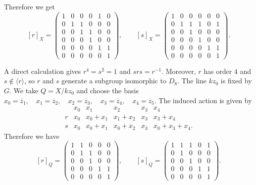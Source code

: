 \documentclass[11pt]{article}
\theoremstyle{definition}
\begin{document}
	
	Therefore we get 
	\begin{equation}\label{eq:X-matrices}
		[r]_X=
		\begin{pmatrix}
			1&0&0&0&1&0\\
			0&1&1&0&0&0\\
			0&0&1&1&0&0\\
			0&0&0&1&0&0\\
			0&0&0&0&1&1\\
			0&0&0&0&0&1
		\end{pmatrix},
		\qquad
		[s]_X=
		\begin{pmatrix}
			1&0&0&0&0&0\\
			0&1&1&1&0&1\\
			0&0&1&0&0&0\\
			0&0&0&1&0&0\\
			0&0&0&0&1&1\\
			0&0&0&0&0&1
		\end{pmatrix}.
	\end{equation}
	
	A direct calculation gives $r^4=s^2=1$ and $srs=r^{-1}$. Moreover, $r$ has order $4$ and $s\notin\langle r\rangle$, so $r$ and $s$ generate a subgroup isomorphic to $D_8$. The line $kz_0$ is fixed by $G$. We take $Q=X/kz_0$ and choose the basis $x_0=\overline z_1, \quad x_1=\overline z_2, \quad x_2=\overline z_3, \quad x_3=\overline z_4, \quad x_4=\overline z_5$.
	The induced action is given by
	\begin{equation}\label{eq:Q-action-table}
		\begin{array}{c|ccccc}
			&x_0&x_1&x_2&x_3&x_4\\ \hline
			r&x_0&x_0+x_1&x_1+x_2&x_3&x_3+x_4\\[1mm]
			s&x_0&x_0+x_1&x_0+x_2&x_3&x_0+x_3+x_4.
		\end{array}
	\end{equation}
	Therefore we have
	\begin{equation}\label{eq:Q-matrices}
		[r]_Q=
		\begin{pmatrix}
			1&1&0&0&0\\
			0&1&1&0&0\\
			0&0&1&0&0\\ 
			0&0&0&1&1\\
			0&0&0&0&1
		\end{pmatrix},
		\qquad
		[s]_Q=
		\begin{pmatrix}
			1&1&1&0&1\\
			0&1&0&0&0\\
			0&0&1&0&0\\
			0&0&0&1&1\\
			0&0&0&0&1
		\end{pmatrix}.
	\end{equation}
	
\end{document}
